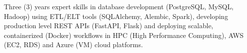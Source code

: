 
\centering Three (3) years expert skills in database development (PostgreSQL, MySQL, Hadoop) using ETL/ELT tools (SQLAlchemy, Alembic, Spark), developing production level REST APIs (FastAPI, Flask) and deploying scalable, containerized (Docker) workflows in HPC (High Performance Computing), AWS (EC2, RDS) and Azure (VM) cloud platforms.